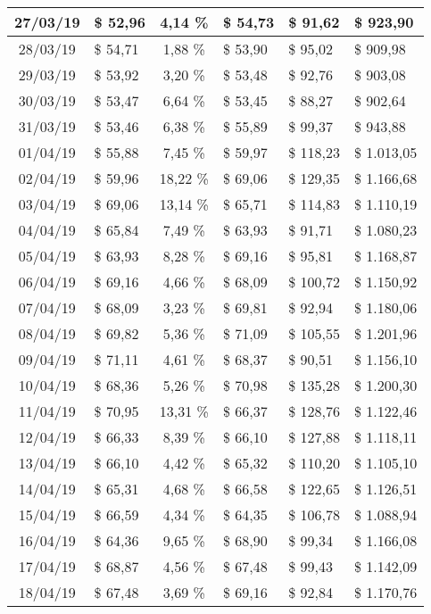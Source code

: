 \begin{center}
\begin{small}
\begin{longtable}{|c|l|c|l|l|l|}
27/03/19 & \$ 52,96 & 4,14 \% & \$ 54,73 & \$ 91,62 & \$ 923,90 \\ \hline
28/03/19 & \$ 54,71 & 1,88 \% & \$ 53,90 & \$ 95,02 & \$ 909,98 \\ \hline
29/03/19 & \$ 53,92 & 3,20 \% & \$ 53,48 & \$ 92,76 & \$ 903,08 \\ \hline
30/03/19 & \$ 53,47 & 6,64 \% & \$ 53,45 & \$ 88,27 & \$ 902,64 \\ \hline
31/03/19 & \$ 53,46 & 6,38 \% & \$ 55,89 & \$ 99,37 & \$ 943,88 \\ \hline
01/04/19 & \$ 55,88 & 7,45 \% & \$ 59,97 & \$ 118,23 & \$ 1.013,05 \\ \hline
02/04/19 & \$ 59,96 & 18,22 \% & \$ 69,06 & \$ 129,35 & \$ 1.166,68 \\ \hline
03/04/19 & \$ 69,06 & 13,14 \% & \$ 65,71 & \$ 114,83 & \$ 1.110,19 \\ \hline
04/04/19 & \$ 65,84 & 7,49 \% & \$ 63,93 & \$ 91,71 & \$ 1.080,23 \\ \hline
05/04/19 & \$ 63,93 & 8,28 \% & \$ 69,16 & \$ 95,81 & \$ 1.168,87 \\ \hline
06/04/19 & \$ 69,16 & 4,66 \% & \$ 68,09 & \$ 100,72 & \$ 1.150,92 \\ \hline
07/04/19 & \$ 68,09 & 3,23 \% & \$ 69,81 & \$ 92,94 & \$ 1.180,06 \\ \hline
08/04/19 & \$ 69,82 & 5,36 \% & \$ 71,09 & \$ 105,55 & \$ 1.201,96 \\ \hline
09/04/19 & \$ 71,11 & 4,61 \% & \$ 68,37 & \$ 90,51 & \$ 1.156,10 \\ \hline
10/04/19 & \$ 68,36 & 5,26 \% & \$ 70,98 & \$ 135,28 & \$ 1.200,30 \\ \hline
11/04/19 & \$ 70,95 & 13,31 \% & \$ 66,37 & \$ 128,76 & \$ 1.122,46 \\ \hline
12/04/19 & \$ 66,33 & 8,39 \% & \$ 66,10 & \$ 127,88 & \$ 1.118,11 \\ \hline
13/04/19 & \$ 66,10 & 4,42 \% & \$ 65,32 & \$ 110,20 & \$ 1.105,10 \\ \hline
14/04/19 & \$ 65,31 & 4,68 \% & \$ 66,58 & \$ 122,65 & \$ 1.126,51 \\ \hline
15/04/19 & \$ 66,59 & 4,34 \% & \$ 64,35 & \$ 106,78 & \$ 1.088,94 \\ \hline
16/04/19 & \$ 64,36 & 9,65 \% & \$ 68,90 & \$ 99,34 & \$ 1.166,08 \\ \hline
17/04/19 & \$ 68,87 & 4,56 \% & \$ 67,48 & \$ 99,43 & \$ 1.142,09 \\ \hline
18/04/19 & \$ 67,48 & 3,69 \% & \$ 69,16 & \$ 92,84 & \$ 1.170,76 \\ \hline

\end{longtable}
\end{small}
\end{center}
